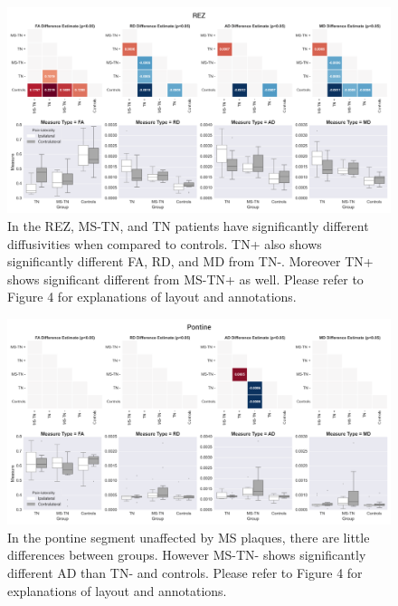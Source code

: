 \begin{figure}[p]
\includegraphics[width=\textwidth]{figure5.png}
\caption{In the REZ, MS-TN, and TN patients have significantly different diffusivities when compared to controls. TN+ also shows significantly different FA, RD, and MD from TN-. Moreover TN+ shows significant different from MS-TN+ as well. Please refer to Figure 4 for explanations of layout and annotations.}
\centering
\label{fig:MSfigure5}
\end{figure}

\begin{figure}[p]
\includegraphics[width=\textwidth]{figure6.png}
\caption{In the pontine segment unaffected by MS plaques, there are little differences between groups. However MS-TN- shows significantly different AD than TN- and controls. Please refer to Figure 4 for explanations of layout and annotations.}
\centering
\label{fig:MSfigure6}
\end{figure}

